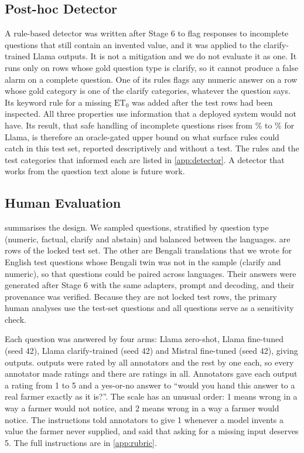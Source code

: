 \subsection{Post-hoc Detector}
\label{sec:impl-detector}

A rule-based detector was written after Stage 6 to flag responses to incomplete questions that still contain an invented value, and it was applied to the clarify-trained Llama outputs. It is not a mitigation and we do not evaluate it as one. It runs only on rows whose gold question type is clarify, so it cannot produce a false alarm on a complete question. One of its rules flags any numeric answer on a row whose gold category is one of the \DetGoldCategoriesUsed clarify categories, whatever the question says. Its keyword rule for a missing $\mathrm{ET}_0$ was added after the test rows had been inspected. All three properties use information that a deployed system would not have. Its result, that safe handling of incomplete questions rises from \DetLearnedPct\% to \DetCombinedPct\% for Llama, is therefore an oracle-gated upper bound on what surface rules could catch in this test set, reported descriptively and without a test. The rules and the test categories that informed each are listed in \cref{app:detector}. A detector that works from the question text alone is future work.

\subsection{Human Evaluation}
\label{sec:impl-human}

 summarises the design. We sampled \HumQuestions questions, stratified by question type (\HumQNumeric numeric, \HumQFactual factual, \HumQClarify clarify and \HumQAbstain abstain) and balanced between the languages. \HumInTest are rows of the locked test set. The other \HumAuthored are Bengali translations that we wrote for English test questions whose Bengali twin was not in the sample (\AuthoredClarify clarify and \AuthoredNumeric numeric), so that questions could be paired across languages. Their answers were generated after Stage 6 with the same adapters, prompt and decoding, and their provenance was verified. Because they are not locked test rows, the primary human analyses use the \HumInTest test-set questions and all \HumQuestions questions serve as a sensitivity check.

Each question was answered by four arms: Llama zero-shot, Llama fine-tuned (seed 42), Llama clarify-trained (seed 42) and Mistral fine-tuned (seed 42), giving \HumUniqueOutputs outputs. \HumOverlapOutputs outputs were rated by all \HumAnnotators annotators and the rest by one each, so every annotator made \HumPerAnnotator ratings and there are \HumJudgments ratings in all. Annotators gave each output a rating from 1 to 5 and a yes-or-no answer to ``would you hand this answer to a real farmer exactly as it is?''. The scale has an unusual order: 1 means wrong in a way a farmer would not notice, and 2 means wrong in a way a farmer would notice. The instructions told annotators to give 1 whenever a model invents a value the farmer never supplied, and said that asking for a missing input deserves 5. The full instructions are in \cref{app:rubric}.

